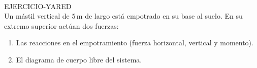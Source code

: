 

  \\
 \begin{multicols}{2}
    \begin{excercise}[][][]{}{
           EJERCICIO-YARED\\
           Un mástil vertical de \( 5 \, \text{m} \) de largo está empotrado en su base al suelo. En su extremo superior actúan dos fuerzas: 
            \begin{enumerate}
                \item Las reacciones en el empotramiento (fuerza horizontal, vertical y momento).
                \item El diagrama de cuerpo libre del sistema.
            \end{enumerate}
            }
    \end{excercise}
 \end{multicols}
